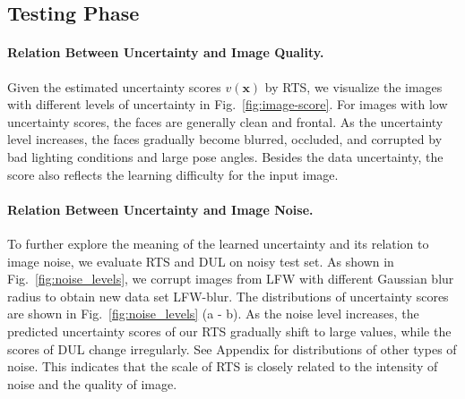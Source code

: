 \documentclass[letterpaper]{article} %
\begin{document}
\subsection{Testing Phase}
\label{ssec:testing phase}
\paragraph{Relation Between Uncertainty and Image Quality.}
Given the estimated uncertainty scores $v(\bm{x})$ by RTS, we visualize the images with different levels of uncertainty in Fig.~\ref{fig:image-score}. For images with low uncertainty scores, the faces are generally clean and frontal. As the uncertainty level increases, the faces gradually become blurred, occluded, and corrupted by bad lighting conditions and large pose angles. Besides the data uncertainty, the score also reflects the learning difficulty for the input image.

\paragraph{Relation Between Uncertainty and Image Noise.}
To further explore the meaning of the learned uncertainty and its relation to image noise, we evaluate RTS and DUL on noisy test set. As shown in Fig.~\ref{fig:noise_levels}, we corrupt images from LFW with different Gaussian blur radius to obtain new data set LFW-blur. 
%
The distributions of uncertainty scores are shown in Fig.~\ref{fig:noise_levels} (a - b). As the noise level increases, the predicted uncertainty scores of our RTS gradually shift to large values, while the scores of DUL change irregularly. 
%
See Appendix for distributions of other types of noise. 
%
This indicates that the scale of RTS is closely related to the intensity of noise and the quality of image.
\end{document}

